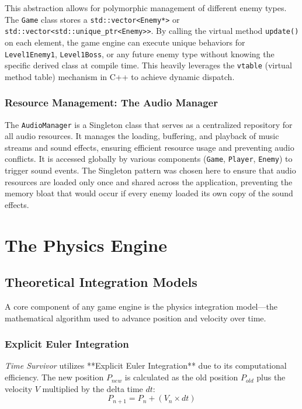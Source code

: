 \documentclass[10pt, a4paper]{article}
\begin{document}
This abstraction allows for polymorphic management of different enemy types. The \texttt{Game} class stores a \texttt{std::vector<Enemy*>} or \texttt{std::vector<std::unique\_ptr<Enemy>>}. By calling the virtual method \texttt{update()} on each element, the game engine can execute unique behaviors for \texttt{Level1Enemy1}, \texttt{Level1Boss}, or any future enemy type without knowing the specific derived class at compile time. This heavily leverages the \texttt{vtable} (virtual method table) mechanism in C++ to achieve dynamic dispatch.

\subsubsection{Resource Management: The Audio Manager}
The \texttt{AudioManager} is a Singleton class that serves as a centralized repository for all audio resources. It manages the loading, buffering, and playback of music streams and sound effects, ensuring efficient resource usage and preventing audio conflicts. It is accessed globally by various components (\texttt{Game}, \texttt{Player}, \texttt{Enemy}) to trigger sound events. The Singleton pattern was chosen here to ensure that audio resources are loaded only once and shared across the application, preventing the memory bloat that would occur if every enemy loaded its own copy of the sound effects.

\newpage

\section{The Physics Engine}

\subsection{Theoretical Integration Models}
A core component of any game engine is the physics integration model—the mathematical algorithm used to advance position and velocity over time. 

\subsubsection{Explicit Euler Integration}
\textit{Time Survivor} utilizes **Explicit Euler Integration** due to its computational efficiency. The new position $P_{new}$ is calculated as the old position $P_{old}$ plus the velocity $V$ multiplied by the delta time $dt$:
\begin{equation}
P_{n+1} = P_{n} + (V_n \times dt)
\end{equation}
\end{document}
